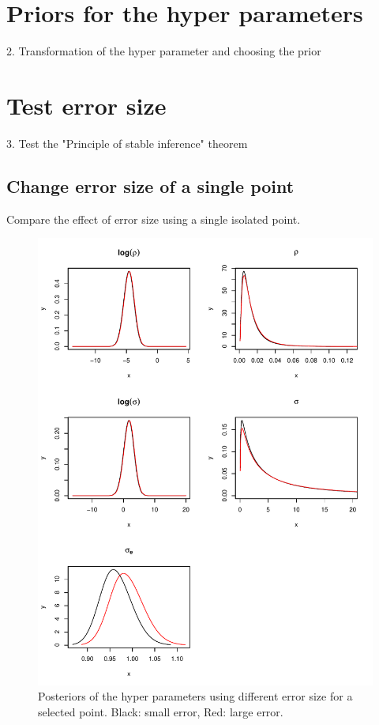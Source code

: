 \documentclass[a4paper,12pt]{article}
\begin{document}
\section{Priors for the hyper parameters }
2. Transformation of the hyper parameter and choosing the prior

\newpage
\section{Test error size}
3. Test the "Principle of stable inference" theorem 
\subsection{Change error size of a single point}
 Compare the effect of error size using a single isolated point.
 
 \begin{figure}[htbp]
 \begin{center}
 \includegraphics[scale=0.8]{fig/PointErr_hyperpar.pdf}
 \end{center}
 \caption[Posteriors of hyper parameters]{Posteriors of the hyper parameters using different error size for a selected point. Black: small error, Red: large error.}
 \label{fig:5}
 \end{figure}
 
\end{document}
